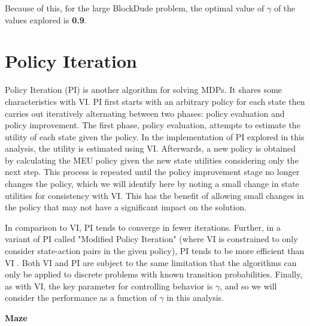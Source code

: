 \documentclass{article}
\begin{document}
Because of this, for the large BlockDude problem, the optimal value of $\gamma$ of the values explored is \textbf{0.9}.


\section{Policy Iteration} \label{PI}

Policy Iteration (PI) is another algorithm for solving MDPs. It shares some characteristics with VI.
PI first starts with an arbitrary policy for each state then carries out iteratively alternating between two phases:
policy evaluation and policy improvement. The first phase, policy evaluation, attempts to estimate the utility of each
state given the policy. In the implementation of PI explored in this analysis, the utility is estimated using VI.
Afterwards, a new policy is obtained by calculating the MEU policy given the new state utilities considering only the next step.
This process is repeated until the policy improvement stage no longer changes the policy, which we will identify here
by noting a small change in state utilities for consistency with VI. This has the benefit of allowing small changes in the policy
that may not have a significant impact on the solution.

In comparison to VI, PI tends to converge in fewer iterations. Further, in a variant of PI called "Modified Policy
Iteration" (where VI is constrained to only consider state-action pairs in the given policy), PI tends to be more efficient
than VI \cite{textbook}. Both VI and PI are subject to the same limitation that the algorithms can only be applied to
discrete problems with known transition probabilities. Finally, as with VI, the key parameter for controlling behavior
is $\gamma$, and so we will consider the performance as a function of $\gamma$ in this analysis.

\textbf{Maze}
\end{document}
